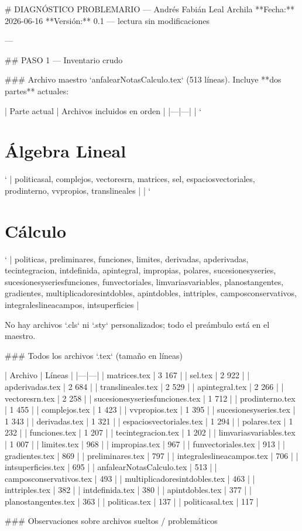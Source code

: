 # DIAGNÓSTICO PROBLEMARIO — Andrés Fabián Leal Archila
**Fecha:** 2026-06-16  
**Versión:** 0.1 — lectura sin modificaciones

---

## PASO 1 — Inventario crudo

### Archivo maestro
`anfalearNotasCalculo.tex` (513 líneas). Incluye **dos partes** actuales:

| Parte actual | Archivos incluidos en orden |
|---|---|
| `\part{Álgebra Lineal}` | politicasal, complejos, vectoresrn, matrices, sel, espaciosvectoriales, prodinterno, vvpropios, translineales |
| `\part{Cálculo}` | politicas, preliminares, funciones, limites, derivadas, apderivadas, tecintegracion, intdefinida, apintegral, impropias, polares, sucesionesyseries, sucesionesyseriesfunciones, funvectoriales, limvariasvariables, planostangentes, gradientes, multiplicadoresintdobles, apintdobles, inttriples, camposconservativos, integraleslineacampos, intsuperficies |

No hay archivos `.cls` ni `.sty` personalizados; todo el preámbulo está en el maestro.

### Todos los archivos `.tex` (tamaño en líneas)

| Archivo | Líneas |
|---|---|
| matrices.tex | 3 167 |
| sel.tex | 2 922 |
| apderivadas.tex | 2 684 |
| translineales.tex | 2 529 |
| apintegral.tex | 2 266 |
| vectoresrn.tex | 2 258 |
| sucesionesyseriesfunciones.tex | 1 712 |
| prodinterno.tex | 1 455 |
| complejos.tex | 1 423 |
| vvpropios.tex | 1 395 |
| sucesionesyseries.tex | 1 343 |
| derivadas.tex | 1 321 |
| espaciosvectoriales.tex | 1 294 |
| polares.tex | 1 232 |
| funciones.tex | 1 207 |
| tecintegracion.tex | 1 202 |
| limvariasvariables.tex | 1 007 |
| limites.tex | 968 |
| impropias.tex | 967 |
| funvectoriales.tex | 913 |
| gradientes.tex | 869 |
| preliminares.tex | 797 |
| integraleslineacampos.tex | 706 |
| intsuperficies.tex | 695 |
| anfalearNotasCalculo.tex | 513 |
| camposconservativos.tex | 493 |
| multiplicadoresintdobles.tex | 463 |
| inttriples.tex | 382 |
| intdefinida.tex | 380 |
| apintdobles.tex | 377 |
| planostangentes.tex | 363 |
| politicas.tex | 137 |
| politicasal.tex | 117 |

### Observaciones sobre archivos sueltos / problemáticos

